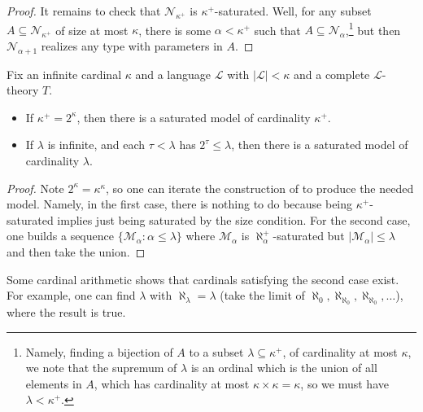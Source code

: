 \documentclass[../notes.tex]{subfiles}
\begin{document}
\begin{proof}
	It remains to check that $\mathcal N_{\kappa^+}$ is $\kappa^+$-saturated. Well, for any subset $A\subseteq\mathcal N_{\kappa^+}$ of size at most $\kappa$, there is some $\alpha<\kappa^+$ such that $A\subseteq\mathcal N_\alpha$,\footnote{Namely, finding a bijection of $A$ to a subset $\lambda\subseteq\kappa^+$, of cardinality at most $\kappa$, we note that the supremum of $\lambda$ is an ordinal which is the union of all elements in $A$, which has cardinality at most $\kappa\times\kappa=\kappa$, so we must have $\lambda<\kappa^+$.} but then $\mathcal N_{\alpha+1}$ realizes any type with parameters in $A$.
\end{proof}
\begin{theorem}
	Fix an infinite cardinal $\kappa$ and a language $\mathcal L$ with $\left|\mathcal L\right|<\kappa$ and a complete $\mathcal L$-theory $T$.
	\begin{itemize}
		\item If $\kappa^+=2^\kappa$, then there is a saturated model of cardinality $\kappa^+$.
		\item If $\lambda$ is infinite, and each $\tau<\lambda$ has $2^\tau\le\lambda$, then there is a saturated model of cardinality $\lambda$.
	\end{itemize}
\end{theorem}
\begin{proof}
	Note $2^\kappa=\kappa^\kappa$, so one can iterate the construction of  to produce the needed model. Namely, in the first case, there is nothing to do because being $\kappa^+$-saturated implies just being saturated by the size condition. For the second case, one builds a sequence $\{\mathcal M_\alpha:\alpha\le\lambda\}$ where $\mathcal M_\alpha$ is $\aleph_\alpha^+$-saturated but $\left|\mathcal M_\alpha\right|\le\lambda$ and then take the union.
\end{proof}
\begin{remark}
	Some cardinal arithmetic shows that cardinals satisfying the second case exist. For example, one can find $\lambda$ with $\aleph_\lambda=\lambda$ (take the limit of $\aleph_0,\aleph_{\aleph_0},\aleph_{\aleph_0},\ldots$), where the result is true.
\end{remark}
\end{document}
